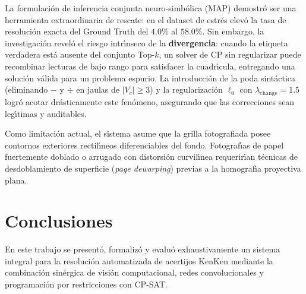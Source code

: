 \documentclass[conference]{IEEEtran}
\begin{document}
La formulaci\'on de inferencia conjunta neuro-simb\'olica (MAP) demostr\'o ser una herramienta extraordinaria de rescate: en el dataset de estr\'es elev\'o la tasa de resoluci\'on exacta del Ground Truth del $4.0\%$ al $58.0\%$. Sin embargo, la investigaci\'on revel\'o el riesgo intr\'{\i}nseco de la \textbf{divergencia}: cuando la etiqueta verdadera est\'a ausente del conjunto Top-$k$, un solver de CP sin regularizar puede recombinar lecturas de bajo rango para satisfacer la cuadr\'{\i}cula, entregando una soluci\'on v\'alida para un problema espurio. La introducci\'on de la poda sint\'actica (eliminando $-$ y $\div$ en jaulas de $|V_c| \ge 3$) y la regularizaci\'on $\ell_0$ con $\lambda_{\text{change}} = 1.5$ logr\'o acotar dr\'asticamente este fen\'omeno, asegurando que las correcciones sean leg\'{\i}timas y auditables.

Como limitaci\'on actual, el sistema asume que la grilla fotografiada posee contornos exteriores rectil\'{\i}neos diferenciables del fondo. Fotograf\'{\i}as de papel fuertemente doblado o arrugado con distorsi\'on curvil\'{\i}nea requerir\'{\i}an t\'ecnicas de desdoblamiento de superficie (\textit{page dewarping}) previas a la homograf\'{\i}a proyectiva plana.

\section{Conclusiones}
\label{sec:conclusions}
En este trabajo se present\'o, formaliz\'o y evalu\'o exhaustivamente un sistema integral para la resoluci\'on automatizada de acertijos KenKen mediante la combinaci\'on sin\'ergica de visi\'on computacional, redes convolucionales y programaci\'on por restricciones con CP-SAT.
\end{document}
